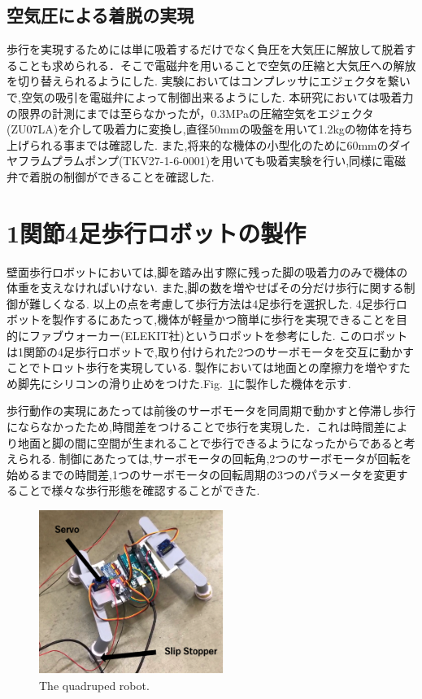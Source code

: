 \documentclass[uplatex,dvipdfmx]{jlreq}
\begin{document}
\subsection{空気圧による着脱の実現}
歩行を実現するためには単に吸着するだけでなく負圧を大気圧に解放して脱着することも求められる．そこで電磁弁を用いることで空気の圧縮と大気圧への解放を切り替えられるようにした.
実験においてはコンプレッサにエジェクタを繋いで,空気の吸引を電磁弁によって制御出来るようにした.
本研究においては吸着力の限界の計測にまでは至らなかったが，0.3MPaの圧縮空気をエジェクタ(ZU07LA)を介して吸着力に変換し,直径50mmの吸盤を用いて1.2kgの物体を持ち上げられる事までは確認した.
また,将来的な機体の小型化のために60mmのダイヤフラムプラムポンプ(TKV27-1-6-0001)を用いても吸着実験を行い,同様に電磁弁で着脱の制御ができることを確認した.


\section{1関節4足歩行ロボットの製作}
壁面歩行ロボットにおいては,脚を踏み出す際に残った脚の吸着力のみで機体の体重を支えなければいけない.
また,脚の数を増やせばその分だけ歩行に関する制御が難しくなる.
以上の点を考慮して歩行方法は4足歩行を選択した.
4足歩行ロボットを製作するにあたって,機体が軽量かつ簡単に歩行を実現できることを目的にファブウォーカー(ELEKIT社)というロボットを参考にした.
このロボットは1関節の4足歩行ロボットで,取り付けられた2つのサーボモータを交互に動かすことでトロット歩行を実現している.
製作においては地面との摩擦力を増やすため脚先にシリコンの滑り止めをつけた.Fig.~\ref{fig:quadruped_robot}に製作した機体を示す.

歩行動作の実現にあたっては前後のサーボモータを同周期で動かすと停滞し歩行にならなかったため,時間差をつけることで歩行を実現した．これは時間差により地面と脚の間に空間が生まれることで歩行できるようになったからであると考えられる.
制御にあたっては,サーボモータの回転角,2つのサーボモータが回転を始めるまでの時間差,1つのサーボモータの回転周期の3つのパラメータを変更することで様々な歩行形態を確認することができた.

\begin{figure}
    \centering
    \includegraphics[width=60mm]{./figure/4legbot.png}
    \caption{The quadruped robot.}
    \label{fig:quadruped_robot}
\end{figure}
\end{document}
